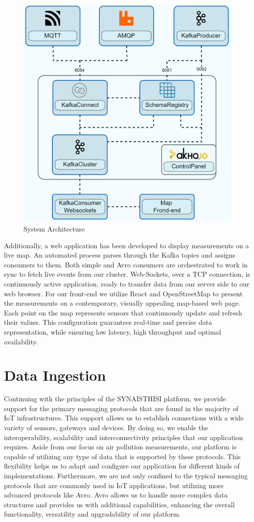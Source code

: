 \begin{figure}[htbp]
	\includegraphics[width=0.75\linewidth]{figures/scheme.drawio.png}
	\centering
	\caption{System Architecture}
	\label{SystemArchitecture}
\end{figure}

Additionally, a web application has been developed to display measurements on a live map. An automated process parses through the Kafka topics and assigns consumers to them. Both simple and Avro consumers are orchestrated to work in sync to fetch live events from our cluster. Web-Sockets, over a TCP connection, is continuously active application, ready to transfer data from our server side to our web browser. For our front-end we utilize React \cite{React} and OpenStreetMap \cite{Openstreetmap} to present the measurements on a contemporary, visually appealing map-based web page. Each point on the map represents sensors that continuously update and refresh their values. This configuration guarantees real-time and precise data representation, while ensuring low latency, high throughput and optimal availability.


\section{Data Ingestion}
Continuing with the principles of the SYNAISTHISI platform, we provide support for the primary messaging protocols that are found in the majority of IoT infrastructures. This support allows us to establish connections with a wide variety of sensors, gateways and devices. By doing so, we enable the interoperability, scalability and interconnectivity principles that our application requires. Aside from our focus on air pollution measurements, our platform is capable of utilizing any type of data that is supported by these protocols. This flexibility helps us to adapt and configure our application for different kinds of implementations. Furthermore, we are not only confined to the typical messaging protocols that are commonly used in IoT applications, but utilizing more advanced protocols like Avro. Avro allows us to handle more complex data structures and provides us with additional capabilities, enhancing the overall functionality, versatility and upgradability of our platform.

